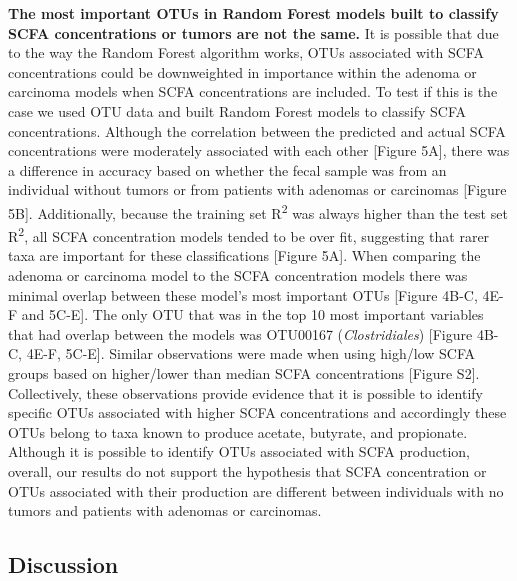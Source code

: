\documentclass[11pt,]{article}
\begin{document}
\textbf{The most important OTUs in Random Forest models built to
classify SCFA concentrations or tumors are not the same.} It is possible
that due to the way the Random Forest algorithm works, OTUs associated
with SCFA concentrations could be downweighted in importance within the
adenoma or carcinoma models when SCFA concentrations are included. To
test if this is the case we used OTU data and built Random Forest models
to classify SCFA concentrations. Although the correlation between the
predicted and actual SCFA concentrations were moderately associated with
each other {[}Figure 5A{]}, there was a difference in accuracy based on
whether the fecal sample was from an individual without tumors or from
patients with adenomas or carcinomas {[}Figure 5B{]}. Additionally,
because the training set R\textsuperscript{2} was always higher than the
test set R\textsuperscript{2}, all SCFA concentration models tended to
be over fit, suggesting that rarer taxa are important for these
classifications {[}Figure 5A{]}. When comparing the adenoma or carcinoma
model to the SCFA concentration models there was minimal overlap between
these model's most important OTUs {[}Figure 4B-C, 4E-F and 5C-E{]}. The
only OTU that was in the top 10 most important variables that had
overlap between the models was OTU00167 (\emph{Clostridiales}) {[}Figure
4B-C, 4E-F, 5C-E{]}. Similar observations were made when using high/low
SCFA groups based on higher/lower than median SCFA concentrations
{[}Figure S2{]}. Collectively, these observations provide evidence that
it is possible to identify specific OTUs associated with higher SCFA
concentrations and accordingly these OTUs belong to taxa known to
produce acetate, butyrate, and propionate. Although it is possible to
identify OTUs associated with SCFA production, overall, our results do
not support the hypothesis that SCFA concentration or OTUs associated
with their production are different between individuals with no tumors
and patients with adenomas or carcinomas.

\newpage

\subsection{Discussion}\label{discussion}
\end{document}
